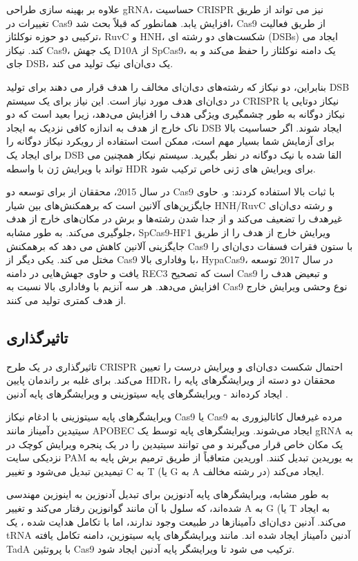 \documentclass[12pt,a4paper,BCOR=.7cm,headsepline,bibliography=totoc]{report}
\begin{document}
علاوه بر بهینه سازی طراحی gRNA، حساسیت CRISPR نیز می تواند از طریق تغییرات در Cas9 افزایش یابد. همانطور که قبلاً بحث شد، Cas9 از طریق فعالیت ترکیبی دو حوزه نوکلئاز، RuvC و HNH، شکست‌های دو رشته ای (DSBs) ایجاد می کند. نیکاز Cas9، یک جهش D10A از SpCas9، یک دامنه نوکلئاز را حفظ می‌کند و به جای DSB، یک دی‌ان‌ای نیک تولید می کند.

بنابراین، دو نیکاز که رشته‌های دی‌ان‌ای مخالف را هدف قرار می دهند برای تولید DSB در دی‌ان‌ای هدف مورد نیاز است. این نیاز برای یک سیستم CRISPR نیکاز دوتایی یا نیکاز دوگانه به طور چشمگیری ویژگی هدف را افزایش می‌دهد، زیرا بعید است که دو ناک خارج از هدف به اندازه کافی نزدیک به ایجاد DSB ایجاد شوند. اگر حساسیت بالا برای آزمایش شما بسیار مهم است، ممکن است استفاده از رویکرد نیکاز دوگانه را برای ایجاد یک DSB القا شده با نیک دوگانه در نظر بگیرید. سیستم نیکاز همچنین می تواند با ویرایش ژن با واسطه HDR برای ویرایش های ژنی خاص ترکیب شود.

در سال 2015، محققان از 
 برای توسعه دو Cas9 با ثبات بالا استفاده کردند:
 و.   
  حاوی جایگزین‌های آلانین است که برهمکنش‌های بین شیار HNH/RuvC و رشته دی‌ان‌ای غیرهدف را تضعیف می‌کند و از جدا شدن رشته‌ها و برش در مکان‌های خارج از هدف جلوگیری می‌کند. به طور مشابه، SpCas9-HF1 ویرایش خارج از هدف را از طریق جایگزینی آلانین کاهش می دهد که برهمکنش Cas9 با ستون فقرات فسفات دی‌ان‌ای را مختل می کند. یکی دیگر از Cas9 با وفاداری بالا، HypaCas9، در سال 2017 توسعه یافت و حاوی جهش‌هایی در دامنه REC3 است که تصحیح Cas9 و تبعیض هدف را افزایش می‌دهد. هر سه آنزیم با وفاداری بالا نسبت به Cas9 نوع وحشی ویرایش خارج از هدف کمتری تولید می کنند.

\subsection{تاثیرگذاری}
تاثیرگذاری در یک طرح CRISPR احتمال شکست دی‌ان‌ای و ویرایش درست را تعیین ‌می‌کند. برای غلبه بر راندمان پایین HDR، محققان دو دسته از ویرایشگرهای پایه را ایجاد کرده‌اند - ویرایشگرهای پایه سیتوزینی  و ویرایشگرهای پایه آدنین .

ویرایشگرهای پایه سیتوزینی با ادغام نیکاز Cas9 یا Cas9 مرده غیرفعال کاتالیزوری  به سیتیدین دآمیناز مانند APOBEC ایجاد می‌شوند. ویرایشگرهای پایه توسط یک gRNA به یک مکان خاص قرار می‌گیرند و می توانند سیتیدین را در یک پنجره ویرایش کوچک در نزدیکی سایت PAM به یوریدین تبدیل کنند. اوریدین متعاقباً از طریق ترمیم برش پایه به تیمیدین تبدیل می‌شود و تغییر C به T (یا G به A در رشته مخالف) ایجاد می‌کند.

به طور مشابه، ویرایشگرهای پایه آدنوزین برای تبدیل آدنوزین به اینوزین مهندسی شده‌اند، که سلول با آن مانند گوانوزین رفتار می‌کند و تغییر A به G (یا T به  ایجاد می‌کند. آدنین دی‌ان‌ای دآمینازها در طبیعت وجود ندارند، اما با تکامل هدایت شده ، یک tRNA آدنین دآمیناز ایجاد شده اند. مانند ویرایشگرهای پایه سیتوزین، دامنه تکامل یافته TadA با پروتئین Cas9 ترکیب می شود تا ویرایشگر پایه آدنین ایجاد شود.
\end{document}
